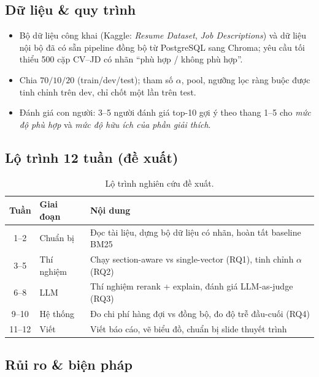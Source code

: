 \documentclass[a4paper,11pt]{article}
\begin{document}
\subsection{Dữ liệu \& quy trình}

\begin{itemize}[leftmargin=1.2em]
  \item Bộ dữ liệu công khai (Kaggle: \emph{Resume Dataset}, \emph{Job Descriptions})
        và dữ liệu nội bộ đã có sẵn pipeline đồng bộ từ PostgreSQL sang Chroma;
        yêu cầu tối thiểu 500 cặp CV--JD có nhãn ``phù hợp / không phù hợp''.
  \item Chia $70/10/20$ (train/dev/test); tham số $\alpha$, pool, ngưỡng lọc ràng buộc
        được tinh chỉnh trên dev, chỉ chốt một lần trên test.
  \item Đánh giá con người: 3--5 người đánh giá top-10 gợi ý theo thang 1--5 cho
        \emph{mức độ phù hợp} và \emph{mức độ hữu ích của phần giải thích}.
\end{itemize}

\subsection{Lộ trình 12 tuần (đề xuất)}

\begin{table}[htbp]
\centering\small
\begin{tabular}{@{}clp{9.4cm}@{}}
\toprule
\textbf{Tuần} & \textbf{Giai đoạn} & \textbf{Nội dung} \\
\midrule
1--2   & Chuẩn bị   & Đọc tài liệu, dựng bộ dữ liệu có nhãn, hoàn tất baseline BM25 \\
3--5   & Thí nghiệm & Chạy section-aware vs single-vector (RQ1), tinh chỉnh $\alpha$ (RQ2) \\
6--8   & LLM        & Thí nghiệm rerank + explain, đánh giá LLM-as-judge (RQ3) \\
9--10  & Hệ thống   & Đo chi phí hàng đợi vs đồng bộ, đo độ trễ đầu-cuối (RQ4) \\
11--12 & Viết       & Viết báo cáo, vẽ biểu đồ, chuẩn bị slide thuyết trình \\
\bottomrule
\end{tabular}
\caption{Lộ trình nghiên cứu đề xuất.}
\label{tab:timeline}
\end{table}

\subsection{Rủi ro \& biện pháp}
\end{document}
